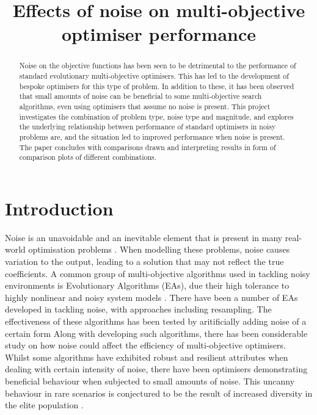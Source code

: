 \documentclass[conference,a4paper]{IEEEtran}
\begin{document}
\title{Effects of noise on multi-objective optimiser performance}

\author{       
}

\maketitle

\begin{abstract}
  Noise on the objective functions has been seen to be detrimental to the performance of standard evolutionary multi-objective optimisers. This has led to the development of bespoke optimisers for this type of problem. In addition to these, it has been observed that small amounts of noise can be beneficial to some multi-objective search algorithms, even using optimisers that assume no noise is present. This project investigates the combination of problem type, noise type and magnitude, and explores the underlying relationship between performance of standard optimisers in noisy problems are, and the situation led to improved performance when noise is present. The paper concludes with comparisons drawn and interpreting results in form of comparison plots of different combinations.
\end{abstract}


\section{Introduction}\label{sec:introduction}
Noise is an unavoidable and an inevitable element that is present in many real-world optimisation problems \cite{branke2003}. When modelling these problems, noise causes variation to the output, leading to a solution that may not reflect the true coefficients. A common group of multi-objective algorithms used in tackling noisy environments is Evolutionary Algorithms (EAs), due their high tolerance to highly nonlinear and noisy system models \cite{then1994, hughes2001}. There have been a number of EAs developed in tackling noise, with approaches including resampling. The effectiveness of these algorithms has been tested by aritificially adding noise of a certain form \cite{hughes2001} Along with developing such algorithms, there has been considerable study on how noise could affect the efficiency of multi-objective optimisers. Whilst some algorithms have exhibited robust and resilient attributes when dealing with certain intensity of noise, there have been optimisers demonstrating beneficial behaviour when subjected to small amounts of noise. This uncanny behaviour in rare scenarios is conjectured to be the result of increased diversity in the elite population \cite{fieldsend2015}.
\end{document}
